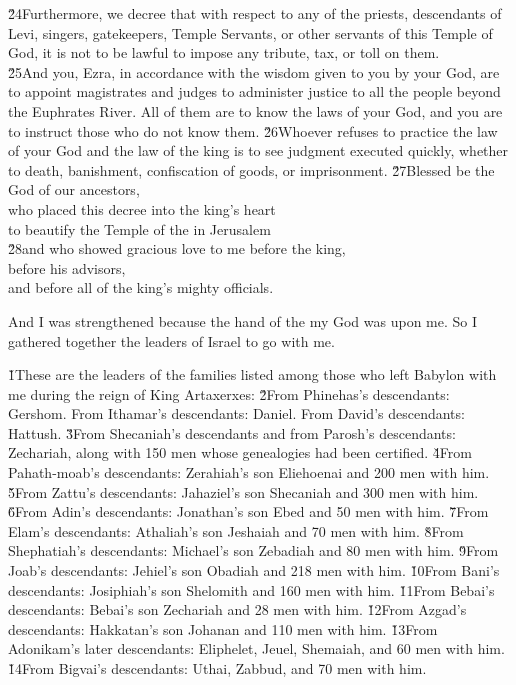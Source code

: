 \begin{poetry}
\poeml \v{24}Furthermore, we decree that with respect to any of the priests, descendants of Levi, singers, gatekeepers, Temple Servants, or other servants of this Temple of God, it is not to be lawful to impose any tribute, tax, or toll on them. \\
\poeml \v{25}And you, Ezra, in accordance with the wisdom given to you by your God, are to appoint magistrates and judges to administer justice to all the people beyond the Euphrates River. All of them are to know the laws of your God, and you are to instruct those who do not know them. \v{26}Whoever refuses to practice the law of your God and the law of the king is to see judgment executed quickly, whether to death, banishment, confiscation of goods, or imprisonment.
\poeml \v{27}Blessed be the  God of our ancestors, \\
\poemll    who placed this decree into the king's heart \\
\poemlll       to beautify the Temple of the  in Jerusalem \\
\poeml \v{28}and who showed gracious love to me before the king, \\
\poemlll       before his advisors, \\
\poemlll       and before all of the king's mighty officials.
\end{poetry}

And I was strengthened because the hand of the  my God was upon me. So I gathered together the leaders of Israel to go with me.

\v{1}These are the leaders of the families listed among those who left Babylon with me during the reign of King Artaxerxes: \v{2}From Phinehas's descendants: Gershom. From Ithamar's descendants: Daniel. From David's descendants: Hattush. \v{3}From Shecaniah's descendants and from Parosh's descendants: Zechariah, along with 150 men whose genealogies had been certified. \v{4}From Pahath-moab's descendants: Zerahiah's son Eliehoenai and 200 men with him. \v{5}From Zattu's descendants: Jahaziel's son Shecaniah and 300 men with him. \v{6}From Adin's descendants: Jonathan's son Ebed and 50 men with him. \v{7}From Elam's descendants: Athaliah's son Jeshaiah and 70 men with him. \v{8}From Shephatiah's descendants: Michael's son Zebadiah and 80 men with him. \v{9}From Joab's descendants: Jehiel's son Obadiah and 218 men with him. \v{10}From Bani's descendants: Josiphiah's son Shelomith and 160 men with him. \v{11}From Bebai's descendants: Bebai's son Zechariah and 28 men with him. \v{12}From Azgad's descendants: Hakkatan's son Johanan and 110 men with him. \v{13}From Adonikam's later descendants: Eliphelet, Jeuel, Shemaiah, and 60 men with him. \v{14}From Bigvai's descendants: Uthai, Zabbud, and 70 men with him.

